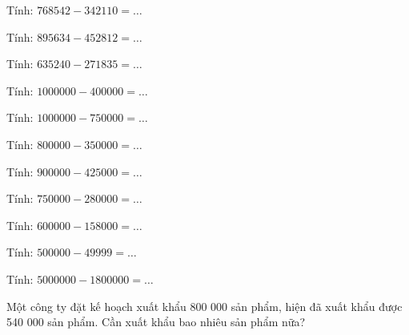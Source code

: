 \begin{ex}
Tính: $768542 - 342110 = \dots$
\end{ex}

\begin{ex}
Tính: $895634 - 452812 = \dots$
\end{ex}

\begin{ex}
Tính: $635240 - 271835 = \dots$
\end{ex}

\begin{ex}
Tính: $1000000 - 400000 = \dots$
\end{ex}

\begin{ex}
Tính: $1000000 - 750000 = \dots$
\end{ex}

\begin{ex}
Tính: $800000 - 350000 = \dots$
\end{ex}

\begin{ex}
Tính: $900000 - 425000 = \dots$
\end{ex}

\begin{ex}
Tính: $750000 - 280000 = \dots$
\end{ex}

\begin{ex}
Tính: $600000 - 158000 = \dots$
\end{ex}

\begin{ex}
Tính: $500000 - 49999 = \dots$
\end{ex}

\begin{ex}
Tính: $5000000 - 1800000 = \dots$
\end{ex}

\begin{ex}
Một công ty đặt kế hoạch xuất khẩu 800 000 sản phẩm, hiện đã xuất khẩu được 540 000 sản phẩm. Cần xuất khẩu bao nhiêu sản phẩm nữa?
\end{ex}

